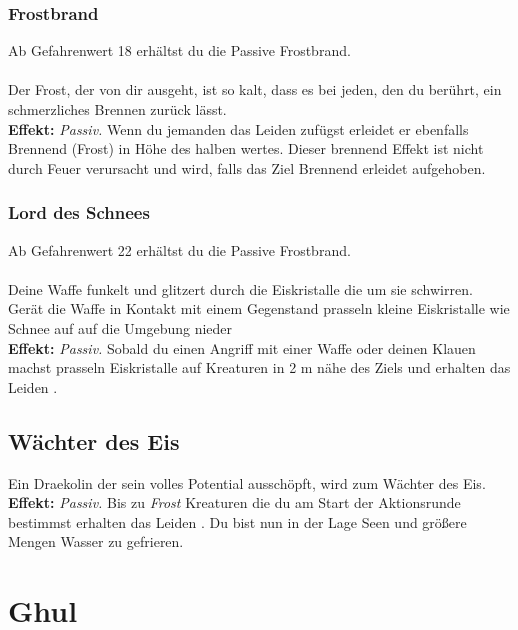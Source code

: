 \subsubsection*{ Frostbrand} \label{sk:frostbrand}
Ab Gefahrenwert 18 erhältst du die Passive Frostbrand.\\
\\
Der Frost, der von dir ausgeht, ist so kalt, dass es bei jeden, den du berührt, ein schmerzliches Brennen zurück lässt.\\
\textbf{Effekt:} \textit{Passiv.} Wenn du jemanden das Leiden  zufügst erleidet er ebenfalls Brennend (Frost) in Höhe des halben wertes. Dieser brennend Effekt ist nicht durch Feuer verursacht und wird, falls das Ziel Brennend erleidet aufgehoben.

\subsubsection*{ Lord des Schnees} \label{sk:lord_des_schnees}
Ab Gefahrenwert 22 erhältst du die Passive Frostbrand.\\
\\
Deine Waffe funkelt und glitzert durch die Eiskristalle die um sie schwirren. Gerät die Waffe in Kontakt mit einem Gegenstand prasseln kleine Eiskristalle wie Schnee auf auf die Umgebung nieder  \\
\textbf{Effekt:} \textit{Passiv.} Sobald du einen Angriff mit einer Waffe oder deinen Klauen machst prasseln Eiskristalle auf Kreaturen in 2 m nähe des Ziels und erhalten das Leiden .


\subsection*{Wächter des Eis} \label{sk:waechterdeseis}
Ein Draekolin der sein volles Potential ausschöpft, wird zum Wächter des Eis.  \\
\textbf{Effekt:} \textit{Passiv.} Bis zu  \textit{ Frost} Kreaturen die du am Start der Aktionsrunde bestimmst erhalten das Leiden \textit{}.
Du bist nun in der Lage Seen und größere Mengen Wasser zu gefrieren.



\clearpage

\section{Ghul} \label{art:ghul}

